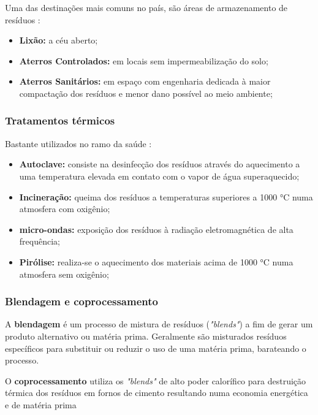 Uma das destinações mais comuns no país, são áreas de armazenamento de resíduos \cite{diagnostico_cristine}:
\begin{itemize} 
	\item \textbf{Lixão:} a céu aberto;
	\item \textbf{Aterros Controlados:} em locais sem impermeabilização do solo;
	\item \textbf{Aterros Sanitários:} em espaço com engenharia dedicada à maior compactação dos resíduos e menor dano possível ao meio ambiente;
\end{itemize}
\subsubsection{Tratamentos térmicos}
Bastante utilizados no ramo da saúde \cite{diagnostico_cristine}:
\begin{itemize} 
	\item \textbf{Autoclave:} consiste na desinfecção dos resíduos através do aquecimento a uma temperatura elevada em contato com o vapor de água superaquecido;
	\item \textbf{Incineração:} queima dos resíduos a temperaturas superiores a 1000 °C numa atmosfera com oxigênio;
	\item \textbf{micro-ondas:} exposição dos resíduos à radiação eletromagnética de alta frequência;
	\item \textbf{Pirólise:} realiza-se o aquecimento dos materiais acima de 1000 °C numa atmosfera sem oxigênio;
\end{itemize}

\subsubsection{Blendagem e coprocessamento}

A \textbf{blendagem} é um processo de mistura de resíduos (\textit{"blends"}) a fim de gerar um produto alternativo ou matéria prima. Geralmente são misturados resíduos específicos para substituir ou reduzir o uso de uma matéria prima, barateando o processo. 

O \textbf{coprocessamento} utiliza os \textit{"blends"} de alto poder calorífico para destruição térmica dos resíduos em fornos de cimento resultando numa economia energética e de matéria prima \cite{noauthor_destinacao_nodate}


